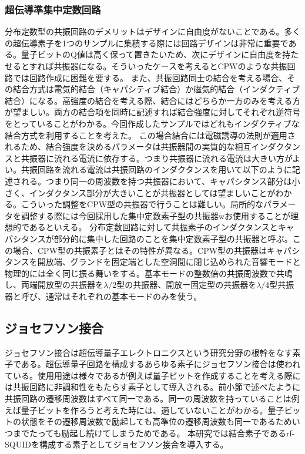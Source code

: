         \subsubsection{超伝導準集中定数回路}
            分布定数型の共振回路のデメリットはデザインに自由度がないことである。多くの超伝導素子を1つのサンプルに集積する際には回路デザインは非常に重要である。量子ビットのQ値は高く保って置きたいため、次にデザインに自由度を持たせるとすれば共振器になる。そういったケースを考えるとCPWのような共振回路では回路作成に困難を要する。
            また、共振回路同士の結合を考える場合、その結合方式は電気的結合（キャパシティブ結合）か磁気的結合（インダクティブ結合）になる。高強度の結合を考える際、結合にはどちらか一方のみを考える方が望ましい。両方の結合項を同時に記述すれば結合強度に対してそれぞれ逆符号をとっていることがわかる。今回作成したサンプルではどれもインダクティブな結合方式を利用することを考えた。
            この場合結合には電磁誘導の法則が適用されるため、結合強度を決めるパラメータは共振器間の実質的な相互インダクタンスと共振器に流れる電流に依存する。つまり共振器に流れる電流は大きい方がよい。共振回路を流れる電流は共振回路のインダクタンスを用いて以下のように記述される。つまり同一の周波数を持つ共振器において、キャパシタンス部分は小さく、インダクタンス部分が大きいことが共振器としては望ましいことがわかる。こういった調整をCPW型の共振器で行うことは難しい。局所的なパラメータを調整する際には今回採用した集中定数素子型の共振器wお使用することが理想的であるといえる。
            分布定数回路に対して共振素子のインダクタンスとキャパシタンスが部分的に集中した回路のことを集中定数素子型の共振器と呼ぶ。この場合、CPW型の共振素子とはその特性が異なる。CPW型の共振器はキャパシタンスを開放端、グランドを固定端とした空洞間に閉じ込められた音響モードと物理的には全く同じ振る舞いをする。基本モードの整数倍の共振周波数で共鳴し、両端開放型の共振器を$\lambda/2$型の共振器、開放ー固定型の共振器を$\lambda/4$型共振器と呼び、通常はそれぞれの基本モードのみを使う。
    \subsection{ジョセフソン接合}
            ジョセフソン接合は超伝導量子エレクトロニクスという研究分野の根幹をなす素子である。超伝導量子回路を構成するあらゆる素子にジョセフソン接合は使われている。使用用途は様々であるが例えば量子ビットを作成することを考える際には共振回路に非調和性をもたらす素子として導入される。前小節で述べたように共振回路の遷移周波数はすべて同一である。同一の周波数を持っていることは例えば量子ビットを作ろうと考えた時には、適していないことがわかる。量子ビットの状態をその遷移周波数で励起しても高準位の遷移周波数も同一であるためいつまでたっても励起し続けてしまうためである。
            本研究では結合素子であるrf-SQUIDを構成する素子としてジョセフソン接合を導入する。

